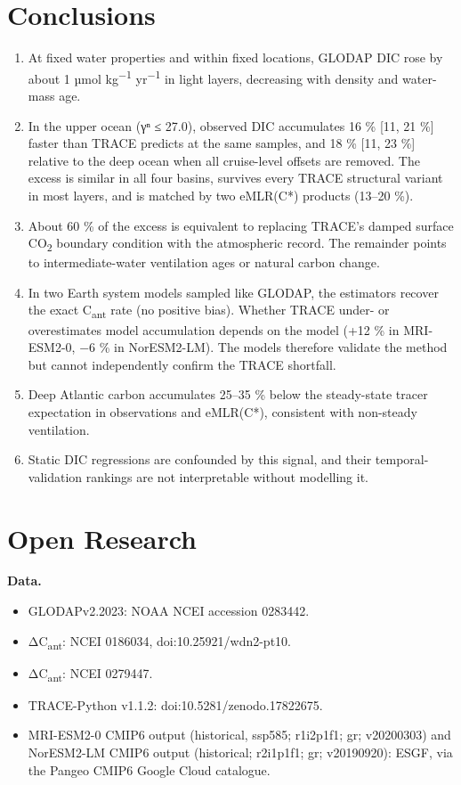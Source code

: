 \documentclass[11pt]{article}
\providecommand{\tightlist}{\setlength{\itemsep}{0pt}\setlength{\parskip}{0pt}}
\begin{document}
\section{Conclusions}\label{conclusions}

\begin{enumerate}
\def\labelenumi{\arabic{enumi}.}
\tightlist
\item
  At fixed water properties and within fixed locations, GLODAP DIC rose
  by about 1 µmol kg\textsuperscript{−1} yr\textsuperscript{−1} in light
  layers, decreasing with density and water-mass age.
\item
  In the upper ocean (γⁿ ≤ 27.0), observed DIC accumulates 16 \% {[}11,
  21 \%{]} faster than TRACE predicts at the same samples, and 18 \%
  {[}11, 23 \%{]} relative to the deep ocean when all cruise-level
  offsets are removed. The excess is similar in all four basins,
  survives every TRACE structural variant in most layers, and is matched
  by two eMLR(C*) products (13--20 \%).
\item
  About 60 \% of the excess is equivalent to replacing TRACE's damped
  surface CO\textsubscript{2} boundary condition with the atmospheric
  record. The remainder points to intermediate-water ventilation ages or
  natural carbon change.
\item
  In two Earth system models sampled like GLODAP, the estimators recover
  the exact C\textsubscript{ant} rate (no positive bias). Whether TRACE
  under- or overestimates model accumulation depends on the model (+12
  \% in MRI-ESM2-0, −6 \% in NorESM2-LM). The models therefore validate
  the method but cannot independently confirm the TRACE shortfall.
\item
  Deep Atlantic carbon accumulates 25--35 \% below the steady-state
  tracer expectation in observations and eMLR(C*), consistent with
  non-steady ventilation.
\item
  Static DIC regressions are confounded by this signal, and their
  temporal-validation rankings are not interpretable without modelling
  it.
\end{enumerate}

\section*{Open Research}\label{open-research}

\textbf{Data.}

\begin{itemize}
\tightlist
\item
  GLODAPv2.2023: NOAA NCEI accession 0283442.
\item
  \citet{Gruber2019} ΔC\textsubscript{ant}: NCEI 0186034,
  doi:10.25921/wdn2-pt10.
\item
  \citet{Mueller2023} ΔC\textsubscript{ant}: NCEI 0279447.
\item
  TRACE-Python v1.1.2: doi:10.5281/zenodo.17822675.
\item
  MRI-ESM2-0 CMIP6 output (historical, ssp585; r1i2p1f1; gr; v20200303)
  and NorESM2-LM CMIP6 output (historical; r2i1p1f1; gr; v20190920):
  ESGF, via the Pangeo CMIP6 Google Cloud catalogue.
\end{itemize}
\end{document}
